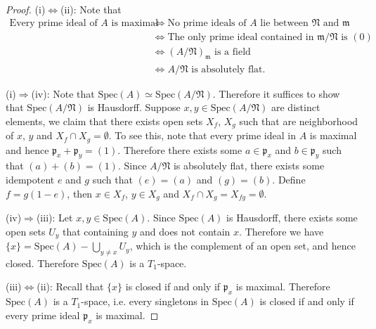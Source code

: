 \begin{proof}
(i)$\iff$(ii): Note that 
$$
\begin{aligned}
\text{Every prime ideal of }A\text{ is maximal}
&\iff
\text{No prime ideals of }A\text{ lie between }\mathfrak{N}\text{ and }\mathfrak{m}\\
&\iff
\text{The only prime ideal contained in }\mathfrak{m}/\mathfrak{N}\text{ is }(0)\\
&\iff
(A/\mathfrak{N})_\mathfrak{m}\text{ is a field}\\
&\iff
A/\mathfrak{N}\text{ is absolutely flat}.
\end{aligned}
$$\par
(i)$\Rightarrow$(iv): Note that $\mathrm{Spec}(A)\simeq\mathrm{Spec}(A/\mathfrak{N})$. Therefore it suffices to show that $\mathrm{Spec}(A/\mathfrak{N})$ is Hausdorff. Suppose $x,y\in\mathrm{Spec}(A/\mathfrak{N})$ are distinct elements, we claim that there exists open sets $X_f$, $X_g$ such that are neighborhood of $x$, $y$ and $X_f\cap X_g=\emptyset$. To see this, note that every prime ideal in $A$ is maximal and hence $\mathfrak{p}_x+\mathfrak{p}_y=(1)$. Therefore there exists some $a\in\mathfrak{p}_x$ and $b\in\mathfrak{p}_y$ such that $(a)+(b)=(1)$. Since $A/\mathfrak{N}$ is absolutely flat, there exists some idempotent $e$ and $g$ such that $(e)=(a)$ and $(g)=(b)$. Define $f=g(1-e)$, then $x\in X_f$, $y\in X_g$ and $X_f\cap X_g=X_{fg}=\emptyset$.\par
(iv)$\Rightarrow$(iii): Let $x,y\in\mathrm{Spec}(A)$. Since $\mathrm{Spec}(A)$ is Hausdorff, there exists some open sets $U_y$ that containing $y$ and does not contain $x$. Therefore we have $\{x\}=\mathrm{Spec}(A)-\bigcup_{y\ne x}U_y$, which is the complement of an open set, and hence closed. Therefore $\mathrm{Spec}(A)$ is a $T_1$-space.\par
(iii)$\iff$(ii): Recall that $\{x\}$ is closed if and only if $\mathfrak{p}_x$ is maximal. Therefore $\mathrm{Spec}(A)$ is a $T_1$-space, i.e. every singletons in $\mathrm{Spec}(A)$ is closed if and only if every prime ideal $\mathfrak{p}_x$ is maximal.
\end{proof}